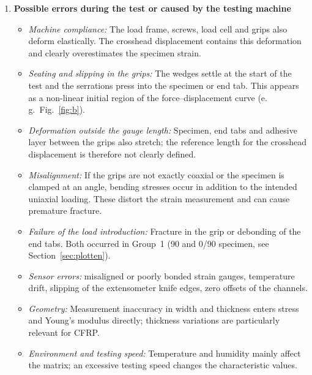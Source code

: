 \documentclass[11pt,a4paper]{article}
\begin{document}
\begin{enumerate}[label=(\alph*)]
\item \textbf{Possible errors during the test or caused by the testing machine}
\begin{itemize}[nosep]
  \item \emph{Machine compliance:} The load frame, screws, load cell and grips
        also deform elastically. The crosshead displacement contains this
        deformation and clearly overestimates the specimen strain.
  \item \emph{Seating and slipping in the grips:} The wedges settle at the
        start of the test and the serrations press into the specimen or end
        tab. This appears as a non-linear initial region of the
        force--displacement curve (e.\,g.\ Fig.~\ref{fig:b}).
  \item \emph{Deformation outside the gauge length:} Specimen, end tabs and
        adhesive layer between the grips also stretch; the reference length
        for the crosshead displacement is therefore not clearly defined.
  \item \emph{Misalignment:} If the grips are not exactly coaxial or the
        specimen is clamped at an angle, bending stresses occur in addition to
        the intended uniaxial loading. These distort the strain measurement
        and can cause premature fracture.
  \item \emph{Failure of the load introduction:} Fracture in the grip or
        debonding of the end tabs. Both occurred in Group~1 (90\textdegree{}
        and 0\textdegree/90\textdegree{} specimen, see
        Section~\ref{sec:plotten}).
  \item \emph{Sensor errors:} misaligned or poorly bonded strain gauges,
        temperature drift, slipping of the extensometer knife edges, zero
        offsets of the channels.
  \item \emph{Geometry:} Measurement inaccuracy in width and thickness enters
        stress and Young's modulus directly; thickness variations are
        particularly relevant for CFRP.
  \item \emph{Environment and testing speed:} Temperature and humidity mainly
        affect the matrix; an excessive testing speed changes the
        characteristic values.
\end{itemize}


\end{enumerate}
\end{document}
